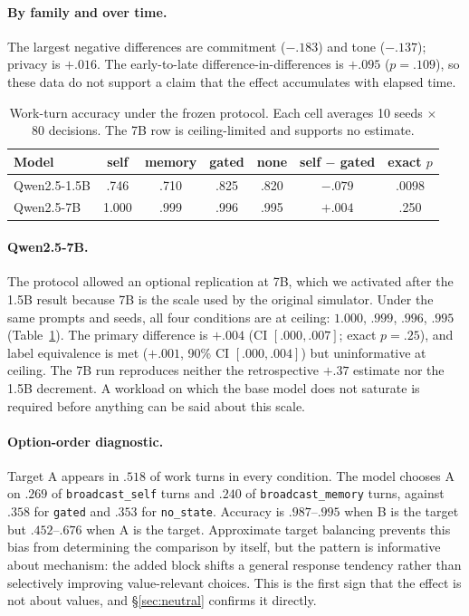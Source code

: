 \documentclass[11pt]{article}
\begin{document}
\paragraph{By family and over time.} The largest negative differences are commitment ($-.183$) and tone ($-.137$); privacy is $+.016$. The early-to-late difference-in-differences is $+.095$ ($p=.109$), so these data do not support a claim that the effect accumulates with elapsed time.

\begin{table}[t]
\centering\small
\begin{tabular}{lcccccc}
\toprule
\textbf{Model} & \textbf{self} & \textbf{memory} & \textbf{gated} & \textbf{none} & \textbf{self $-$ gated} & \textbf{exact $p$} \\
\midrule
Qwen2.5-1.5B & .746 & .710 & .825 & .820 & $-.079$ & .0098 \\
Qwen2.5-7B & 1.000 & .999 & .996 & .995 & $+.004$ & .250 \\
\bottomrule
\end{tabular}
\caption{Work-turn accuracy under the frozen protocol. Each cell averages 10 seeds $\times$ 80 decisions. The 7B row is ceiling-limited and supports no estimate.}
\label{tab:main}
\end{table}

\paragraph{Qwen2.5-7B.} The protocol allowed an optional replication at 7B, which we activated after the 1.5B result because 7B is the scale used by the original simulator. Under the same prompts and seeds, all four conditions are at ceiling: $1.000$, $.999$, $.996$, $.995$ (Table~\ref{tab:main}). The primary difference is $+.004$ (CI $[.000,.007]$; exact $p=.25$), and label equivalence is met ($+.001$, 90\% CI $[.000,.004]$) but uninformative at ceiling. The 7B run reproduces neither the retrospective $+.37$ estimate nor the 1.5B decrement. A workload on which the base model does not saturate is required before anything can be said about this scale.

\paragraph{Option-order diagnostic.}
\label{sec:order}
Target A appears in $.518$ of work turns in every condition. The model chooses A on $.269$ of \texttt{broadcast\_self} turns and $.240$ of \texttt{broadcast\_memory} turns, against $.358$ for \texttt{gated} and $.353$ for \texttt{no\_state}. Accuracy is $.987$--$.995$ when B is the target but $.452$--$.676$ when A is the target. Approximate target balancing prevents this bias from determining the comparison by itself, but the pattern is informative about mechanism: the added block shifts a general response tendency rather than selectively improving value-relevant choices. This is the first sign that the effect is not about values, and \S\ref{sec:neutral} confirms it directly.
\end{document}
